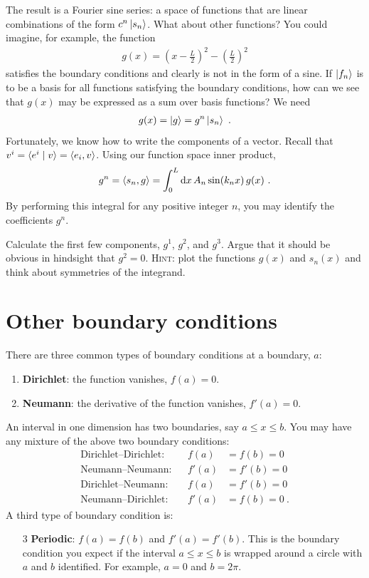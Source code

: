 \documentclass[12pt, oneside]{report}    %
\let\oldsection\section
\def\section{%
  \setcounter{sidenote}{1}%
  \oldsection
}
\begin{document}
The result is a Fourier sine series: a space of functions that are linear combinations of the form $c^n\left|s_n\right\rangle$.  What about other functions? You could imagine, for example, the function 
\begin{align}
    g(x) = \left(x-\frac{L}{2}\right)^2 - \left(\frac{L}{2}\right)^2
\end{align}
satisfies the boundary conditions and clearly is not in the form of a sine. If $\left|f_n\right\rangle$ is to be a basis for all functions satisfying the boundary conditions, how can we see that $g(x)$ may be expressed as a sum over basis functions? We need
\begin{align}
    g(x) = \left|g\right\rangle = g^n\left|s_n\right\rangle \ .
\end{align}
Fortunately, we know how to write the components of a vector. Recall that $v^i = \langle e^i \mid v \rangle = \langle e_i, v \rangle$. Using our function space inner product,
\begin{align}
    g^n = \langle s_n, g \rangle 
    = \int_0^L \operatorname{d}\!{x}\, A_n \sin(k_n x) \, g(x)  \ .
\end{align}
By performing this integral for any positive integer $n$, you may identify the coefficients $g^n$.
\begin{exercise}
Calculate the first few components, $g^1$, $g^2$, and $g^3$. Argue that it should be obvious in hindsight that $g^2 = 0$. \textsc{Hint:} plot the functions $g(x)$ and $s_n(x)$ and think about symmetries of the integrand.
\end{exercise}




\section{Other boundary conditions}

There are three common types of boundary conditions at a boundary, $a$:
\begin{enumerate}
    \item \textbf{Dirichlet}: the function vanishes, $f(a)=0$.
    \item \textbf{Neumann}: the derivative of the function vanishes, $f'(a)=0$. 
\end{enumerate}
An interval in one dimension has two boundaries, say $a \leq x \leq b$. You may have any mixture of the above two boundary conditions:
\begin{align}
    \text{Dirichlet--Dirichlet:}
    &&
    f(a)&=f(b)=0
    \\
    \text{Neumann--Neumann:}
    &&
    f'(a)&=f'(b)=0
    \\
    \text{Dirichlet--Neumann:}
    &&
    f(a)&=f'(b)=0
    \\
    \text{Neumann--Dirichlet:}
    &&
    f'(a)&=f(b)=0
    \ .
\end{align}
A third type of boundary condition is:
\begin{enumerate}
    \item[3] \textbf{Periodic}: $f(a)=f(b)$ and $f'(a)=f'(b)$. This is the boundary condition you expect if the interval $a\leq x \leq b$ is wrapped around a circle with $a$ and $b$ identified. For example, $a=0$ and $b=2 \pi$. 
\end{enumerate}
\end{document}
